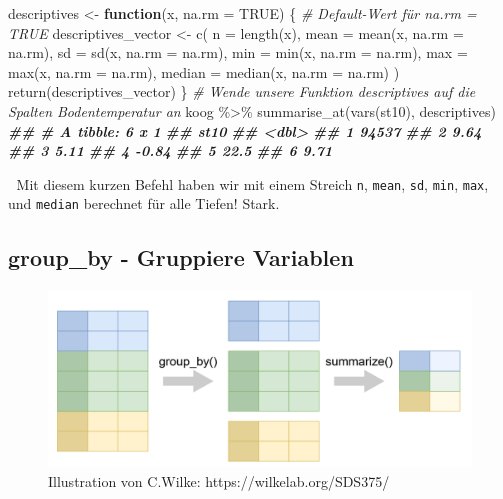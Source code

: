 \documentclass[
]{article}
\newenvironment{Shaded}{\begin{snugshade}}{\end{snugshade}}
\newcommand{\AttributeTok}[1]{\textcolor[rgb]{0.77,0.63,0.00}{#1}}
\newcommand{\CommentTok}[1]{\textcolor[rgb]{0.56,0.35,0.01}{\textit{#1}}}
\newcommand{\ConstantTok}[1]{\textcolor[rgb]{0.00,0.00,0.00}{#1}}
\newcommand{\ControlFlowTok}[1]{\textcolor[rgb]{0.13,0.29,0.53}{\textbf{#1}}}
\newcommand{\DocumentationTok}[1]{\textcolor[rgb]{0.56,0.35,0.01}{\textbf{\textit{#1}}}}
\newcommand{\FunctionTok}[1]{\textcolor[rgb]{0.00,0.00,0.00}{#1}}
\newcommand{\NormalTok}[1]{#1}
\newcommand{\OtherTok}[1]{\textcolor[rgb]{0.56,0.35,0.01}{#1}}
\newcommand{\SpecialCharTok}[1]{\textcolor[rgb]{0.00,0.00,0.00}{#1}}
\begin{document}
\begin{Shaded}
\begin{Highlighting}[]
\NormalTok{descriptives }\OtherTok{\textless{}{-}} \ControlFlowTok{function}\NormalTok{(x, }\AttributeTok{na.rm =} \ConstantTok{TRUE}\NormalTok{) \{ }\CommentTok{\# Default{-}Wert für \textquotesingle{}na.rm\textquotesingle{} = TRUE}
\NormalTok{  descriptives\_vector }\OtherTok{\textless{}{-}} \FunctionTok{c}\NormalTok{(}
    \AttributeTok{n =} \FunctionTok{length}\NormalTok{(x),}
    \AttributeTok{mean =} \FunctionTok{mean}\NormalTok{(x, }\AttributeTok{na.rm =}\NormalTok{ na.rm), }
    \AttributeTok{sd =} \FunctionTok{sd}\NormalTok{(x, }\AttributeTok{na.rm =}\NormalTok{ na.rm),     }
    \AttributeTok{min =} \FunctionTok{min}\NormalTok{(x, }\AttributeTok{na.rm =}\NormalTok{ na.rm),   }
    \AttributeTok{max =} \FunctionTok{max}\NormalTok{(x, }\AttributeTok{na.rm =}\NormalTok{ na.rm),}
    \AttributeTok{median =} \FunctionTok{median}\NormalTok{(x, }\AttributeTok{na.rm =}\NormalTok{ na.rm)}
\NormalTok{  )}
  \FunctionTok{return}\NormalTok{(descriptives\_vector)}
\NormalTok{\}}
\CommentTok{\# Wende unsere Funktion descriptives auf die Spalten Bodentemperatur an}
\NormalTok{koog }\SpecialCharTok{\%\textgreater{}\%}
  \FunctionTok{summarise\_at}\NormalTok{(}\FunctionTok{vars}\NormalTok{(st10), descriptives)}
\DocumentationTok{\#\# \# A tibble: 6 x 1}
\DocumentationTok{\#\#       st10}
\DocumentationTok{\#\#      \textless{}dbl\textgreater{}}
\DocumentationTok{\#\# 1 94537   }
\DocumentationTok{\#\# 2     9.64}
\DocumentationTok{\#\# 3     5.11}
\DocumentationTok{\#\# 4    {-}0.84}
\DocumentationTok{\#\# 5    22.5 }
\DocumentationTok{\#\# 6     9.71}
\end{Highlighting}
\end{Shaded}

🤯 Mit diesem kurzen Befehl haben wir mit einem Streich \texttt{n}, \texttt{mean}, \texttt{sd}, \texttt{min}, \texttt{max}, und \texttt{median} berechnet für alle Tiefen! Stark.

\hypertarget{group_by---gruppiere-variablen}{%
\subsection{group\_by - Gruppiere Variablen}\label{group_by---gruppiere-variablen}}

\begin{figure}

{\centering \includegraphics[width=1\linewidth]{images/041} 

}

\caption{Illustration von C.Wilke: https://wilkelab.org/SDS375/}\label{fig:unnamed-chunk-145}
\end{figure}
\end{document}
